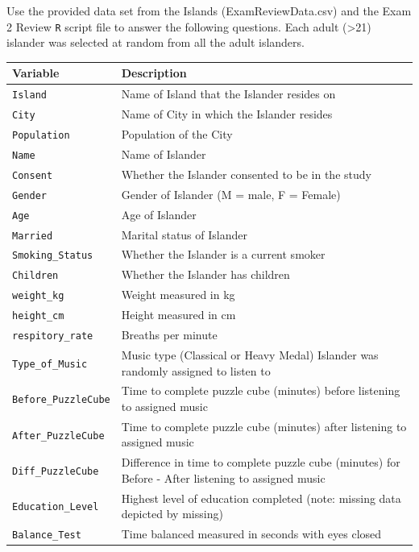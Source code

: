 \documentclass[
]{report}
\begin{document}
Use the provided data set from the Islands (ExamReviewData.csv) and the Exam 2 Review \texttt{R} script file to answer the following questions. Each adult (\textgreater21) islander was selected at random from all the adult islanders.

\begin{longtable}[]{@{}
  >{\raggedright\arraybackslash}p{}
  >{\raggedright\arraybackslash}p{}@{}}
\toprule
\textbf{Variable} & \textbf{Description} \\
\midrule
\endhead
\texttt{Island} & Name of Island that the Islander resides on \\
\texttt{City} & Name of City in which the Islander resides \\
\texttt{Population} & Population of the City \\
\texttt{Name} & Name of Islander \\
\texttt{Consent} & Whether the Islander consented to be in the study \\
\texttt{Gender} & Gender of Islander (M = male, F = Female) \\
\texttt{Age} & Age of Islander \\
\texttt{Married} & Marital status of Islander \\
\texttt{Smoking\_Status} & Whether the Islander is a current smoker \\
\texttt{Children} & Whether the Islander has children \\
\texttt{weight\_kg} & Weight measured in kg \\
\texttt{height\_cm} & Height measured in cm \\
\texttt{respitory\_rate} & Breaths per minute \\
\texttt{Type\_of\_Music} & Music type (Classical or Heavy Medal) Islander was randomly assigned to listen to \\
\texttt{Before\_PuzzleCube} & Time to complete puzzle cube (minutes) before listening to assigned music \\
\texttt{After\_PuzzleCube} & Time to complete puzzle cube (minutes) after listening to assigned music \\
\texttt{Diff\_PuzzleCube} & Difference in time to complete puzzle cube (minutes) for Before - After listening to assigned music \\
\texttt{Education\_Level} & Highest level of education completed (note: missing data depicted by missing) \\
\texttt{Balance\_Test} & Time balanced measured in seconds with eyes closed \\

\end{longtable}
\end{document}
